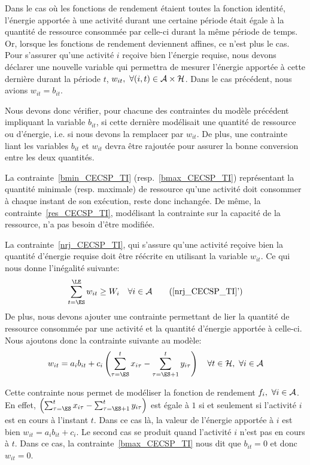 Dans le cas où les fonctions de rendement étaient toutes la fonction
identité, l'énergie apportée à une activité durant une certaine
période était égale à la quantité de ressource consommée par celle-ci
durant la même période de temps. Or, lorsque les fonctions de
rendement deviennent affines, ce n'est plus le cas.  Pour s'assurer
qu'une activité $i$ reçoive bien l'énergie requise, nous devons
déclarer une nouvelle variable qui permettra de mesurer l'énergie
apportée à cette dernière durant la période $t$, $w_{it},\ \forall
(i,t) \in {\cal A} \times {\cal H}$. Dans le cas
précédent, nous avions $w_{it}=b_{it}$.

Nous devons donc vérifier, pour chacune des contraintes du modèle
précédent impliquant la variable $b_{it}$, si cette dernière
modélisait une quantité de ressource ou d'énergie, i.e. si nous devons
la remplacer par $w_{it}$. De plus, une contrainte liant les variables
$b_{it}$ et $w_{it}$ devra être rajoutée pour assurer la bonne
conversion entre les deux quantités.

La contrainte~\eqref{bmin_CECSP_TI} (resp.~\eqref{bmax_CECSP_TI})
représentant la quantité minimale (resp. maximale) de ressource qu'une
activité doit consommer à chaque instant de son exécution, reste donc
inchangée. De même, la contrainte~\eqref{res_CECSP_TI}, modélisant la
contrainte sur la capacité de la ressource, n'a pas besoin d’être
modifiée.

La contrainte~\eqref{nrj_CECSP_TI}, qui s'assure qu'une activité
reçoive bien la quantité d'énergie requise doit être réécrite en
utilisant la variable $w_{it}$. Ce qui nous donne l'inégalité
suivante:
\begin{equation} 
\sum_{t=\ES}^{\LE} w_{it} \ge W_i\quad \forall i \in \A \tag{\ref{nrj_CECSP_TI}'} \label{nrj2_CECSP_TI}
\end{equation} 
De plus, nous devons ajouter une contrainte permettant de lier la
quantité de ressource consommée par une activité et la quantité
d'énergie apportée à celle-ci. Nous ajoutons donc la contrainte
suivante au modèle:
\begin{equation}
w_{it}=a_ib_{it}+c_i\left(\sum_{\tau=\ES}^t
x_{i\tau}-\sum_{\tau=\ES+1}^t y_{i\tau}\right) \quad \forall t\in
\H,\ \forall i \in \A \label{conv_CECSP_TI}
\end{equation} 

Cette contrainte nous permet de modéliser la fonction de rendement
$f_i,\ \forall i \in {\cal A}$. En effet, $\left(\sum_{\tau=\ES}^t
x_{i\tau}-\sum_{\tau=\ES+1}^t y_{i\tau}\right) $ est égale à $1$ si et
seulement si l'activité $i$ est en cours à l'instant $t$.  Dans ce cas
là, la valeur de l'énergie apportée à $i$ est bien
$w_{it}=a_ib_{it}+c_i$. Le second cas se produit quand l'activité $i$
n'est pas en cours à $t$. Dans ce cas, la
contrainte~\eqref{bmax_CECSP_TI} nous dit que $b_{it}=0$ et donc
$w_{it}=0$.

